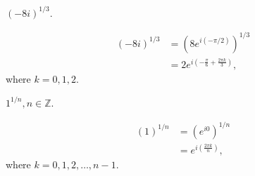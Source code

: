 \documentclass[12pt]{book}
\begin{document}
\begin{exmp}
    $(-8i)^{1/3}.$
\end{exmp}
\begin{align*}
    (-8i)^{1/3} 
        &=
            (8e^{i(-\pi/2)})^{1/3} \\
        &=
            2 e^{i\left(-\frac{\pi}{6} + \frac{2\pi k}{3}\right)},
\end{align*}
where $k = 0, 1, 2.$

\begin{exmp}
    $1^{1/n}, n \in \mathbb{Z}$.
\end{exmp}
\begin{align*}
    (1)^{1/n} 
        &=
            (e^{i 0})^{1/n} \\
        &=
            e^{i\left(\frac{2\pi k}{n}\right)},
\end{align*}
where $k = {0, 1, 2, \dots, n - 1}$.
\end{document}
